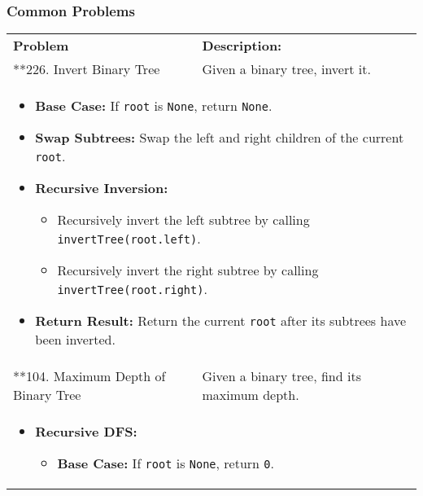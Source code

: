 \subsubsection{Common Problems}
\begin{summary}
    \begin{center}
        \begin{tabular}{ll}
            \toprule
            \textbf{Problem} & \textbf{Description:} \\
            **226. Invert Binary Tree & Given a binary tree, invert it. \\
            \multicolumn{2}{p{\linewidth}}{
                \begin{itemize}
                    \item \textbf{Base Case:} If \texttt{root} is \texttt{None}, return \texttt{None}.
                
                    \item \textbf{Swap Subtrees:} Swap the left and right children of the current \texttt{root}.
                
                    \item \textbf{Recursive Inversion:}
                    \begin{itemize}
                        \item Recursively invert the left subtree by calling \texttt{invertTree(root.left)}.
                        \item Recursively invert the right subtree by calling \texttt{invertTree(root.right)}.
                    \end{itemize}
                
                    \item \textbf{Return Result:} Return the current \texttt{root} after its subtrees have been inverted.
                \end{itemize}                
            } \\
            \midrule
            **104. Maximum Depth of Binary Tree & Given a binary tree, find its maximum depth. \\
            \multicolumn{2}{p{\linewidth}}{
                \begin{itemize}
                    \item \textbf{Recursive DFS:}
                    \begin{itemize}
                        \item \textbf{Base Case:} If \texttt{root} is \texttt{None}, return \texttt{0}.
                    

\end{itemize}
\end{itemize}}
\end{tabular}
\end{center}
\end{summary}
